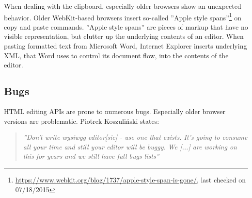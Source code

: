 When dealing with the clipboard, especially older browsers show an unexpected behavior. Older WebKit-based browsers insert so-called ''Apple style spans''\footnote{\url{https://www.webkit.org/blog/1737/apple-style-span-is-gone/}, last checked on 07/18/2015} on copy and paste commands. ''Apple style spans'' are pieces of markup that have no visible representation, but clutter up the underlying contents of an editor. When pasting formatted text from Microsoft Word, Internet Explorer inserts underlying XML, that Word uses to control its document flow, into the contents of the editor.


\subsection{Bugs} 

HTML editing APIs are prone to numerous bugs. Especially older browser versions are problematic. Piotrek Koszuli\'{n}ski states:


\begin{quotation}
\textit{''Don't write wysiwyg editor[sic] - use one that exists. It's going to consume all your time and still your editor will be buggy. We [...] are working on this for years and we still have full bugs lists\cite{sopp}''}
\end{quotation} %


